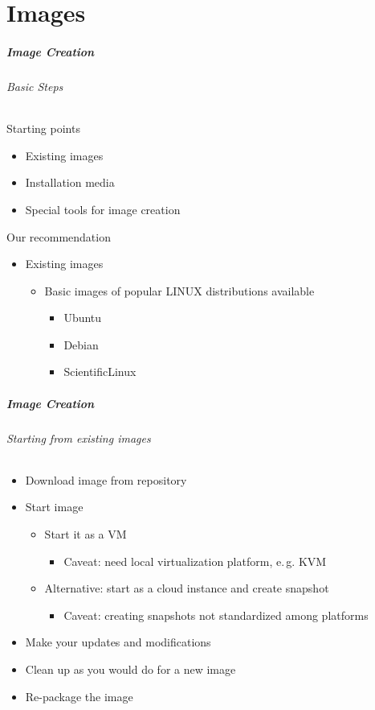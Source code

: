 \part{Images}

\begin{frame}
\frametitle{Image Creation}
\framesubtitle{Basic Steps}
Starting points
\begin{itemize}
\item Existing images
\item Installation media
\item Special tools for image creation
\end{itemize}
Our recommendation
\begin{itemize}
\item Existing images
  \begin{itemize}
  \item Basic images of popular LINUX distributions available
    \begin{itemize}
    \item Ubuntu
    \item Debian
    \item ScientificLinux
    \end{itemize}
  \end{itemize}
\end{itemize}
\end{frame}

\begin{frame}
\frametitle{Image Creation}
\framesubtitle{Starting from existing images}
\begin{itemize}
\item Download image from repository
\item Start image
  \begin{itemize}
  \item Start it as a VM
    \begin{itemize}
    \item Caveat: need local virtualization platform, e.\,g. KVM
    \end{itemize}
  \item Alternative: start as a cloud instance and create snapshot
    \begin{itemize}
    \item Caveat: creating snapshots not standardized among platforms
    \end{itemize}
  \end{itemize}
\item Make your updates and modifications
\item Clean up as you would do for a new image
\item Re-package the image
\end{itemize}

\end{frame}

